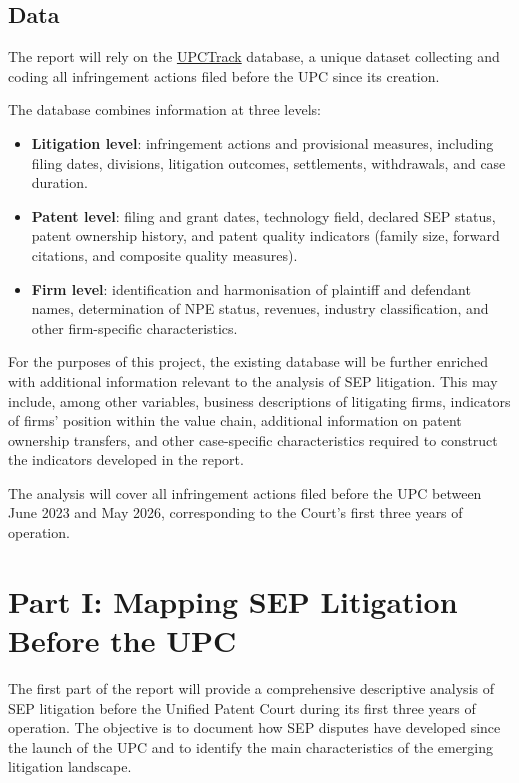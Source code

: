 \documentclass[12pt]{article}
\begin{document}
\subsection*{Data}

The report will rely on the \href{https://upcdashboard.wordpress.com/}{UPCTrack} database, a unique dataset collecting and coding all infringement actions filed before the UPC since its creation.

The database combines information at three levels:

\begin{itemize}
\item \textbf{Litigation level}: infringement actions and provisional measures, including filing dates, divisions, litigation outcomes, settlements, withdrawals, and case duration.
\item \textbf{Patent level}: filing and grant dates, technology field, declared SEP status, patent ownership history, and patent quality indicators (family size, forward citations, and composite quality measures).
\item \textbf{Firm level}: identification and harmonisation of plaintiff and defendant names, determination of NPE status, revenues, industry classification, and other firm-specific characteristics.
\end{itemize}

For the purposes of this project, the existing database will be further enriched with additional information relevant to the analysis of SEP litigation. This may include, among other variables, business descriptions of litigating firms, indicators of firms' position within the value chain, additional information on patent ownership transfers, and other case-specific characteristics required to construct the indicators developed in the report.

The analysis will cover all infringement actions filed before the UPC between June 2023 and May 2026, corresponding to the Court's first three years of operation.


\section*{Part I: Mapping SEP Litigation Before the UPC}

The first part of the report will provide a comprehensive descriptive analysis of SEP litigation before the Unified Patent Court during its first three years of operation. The objective is to document how SEP disputes have developed since the launch of the UPC and to identify the main characteristics of the emerging litigation landscape.
\end{document}
